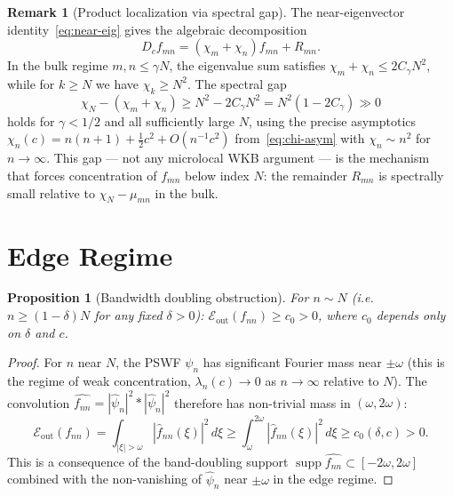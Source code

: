 \documentclass[12pt,a4paper]{amsart}
\newtheorem{proposition}[theorem]{Proposition}
\theoremstyle{definition}
\newtheorem{remark}[theorem]{Remark}
\newcommand{\Eout}{\mathcal{E}_{\mathrm{out}}}
\newcommand{\mumN}{\mu_{mn}}
\begin{document}
\begin{remark}[Product localization via spectral gap]\label{rem:product-localization}
The near-eigenvector identity~\eqref{eq:near-eig} gives the
algebraic decomposition
\[
  D_c f_{mn} = (\chi_m + \chi_n)f_{mn} + R_{mn}.
\]
In the bulk regime $m,n \le \gamma N$, the eigenvalue sum satisfies
$\chi_m + \chi_n \le 2C_\gamma N^2$,
while for $k \ge N$ we have $\chi_k \ge N^2$.
The spectral gap
\[
  \chi_N - (\chi_m + \chi_n)
  \ge N^2 - 2C_\gamma N^2
  = N^2(1 - 2C_\gamma)
  \gg 0
\]
holds for $\gamma < 1/2$ and all sufficiently large $N$,
using the precise asymptotics
$\chi_n(c) = n(n+1) + \tfrac{1}{2}c^2 + O(n^{-1}c^2)$
from~\eqref{eq:chi-asym} with $\chi_n \sim n^2$ for $n \to \infty$.
This gap --- not any microlocal WKB argument --- is the mechanism
that forces concentration of $f_{mn}$ below index $N$:
the remainder $R_{mn}$ is spectrally small relative to
$\chi_N - \mumN$ in the bulk.
\end{remark}

\section{Edge Regime}\label{sec:edge}

\begin{proposition}[Bandwidth doubling obstruction]\label{prop:bwdoubling}
For $n \sim N$ (i.e.\ $n \ge (1-\delta)N$ for any fixed $\delta > 0$):
$\Eout(f_{nn}) \ge c_0 > 0$,
where $c_0$ depends only on $\delta$ and $c$.
\end{proposition}

\begin{proof}
For $n$ near $N$, the PSWF $\psi_n$ has significant Fourier mass
near $\pm\omega$ (this is the regime of weak concentration,
$\lambda_n(c) \to 0$ as $n \to \infty$ relative to $N$).
The convolution $\widehat{f_{nn}} = |\hat\psi_n|^2 * |\hat\psi_n|^2$
therefore has non-trivial mass in $(\omega,2\omega)$:
\[
  \Eout(f_{nn})
  = \int_{|\xi|>\omega}|\hat f_{nn}(\xi)|^2\,d\xi
  \ge \int_\omega^{2\omega}|\hat f_{nn}(\xi)|^2\,d\xi
  \ge c_0(\delta,c) > 0.
\]
This is a consequence of the band-doubling support
$\operatorname{supp}\widehat{f_{nn}} \subset [-2\omega,2\omega]$
combined with the non-vanishing of $\hat\psi_n$ near $\pm\omega$
in the edge regime.
\end{proof}
\end{document}
